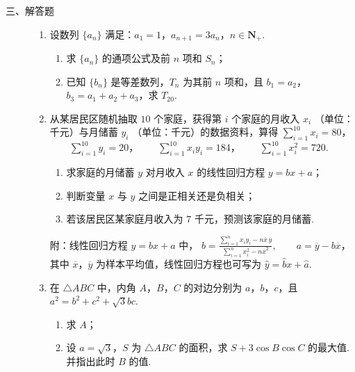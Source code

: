 \begin{description}

    \item[三、解答题]

    \begin{enumerate}[leftmargin=5pt]

      \addtocounter{enumi}{+15}

        \item 设数列 \(\{a_{n}\}\) 满足：\(a_{1} = 1\)，\(a_{n+1} = 3a_{n}\)，\(n \in \mathbf{N}_{+}\).
\begin{enumerate}
\item 求 \( \{a_{n}\} \) 的通项公式及前 \(n\) 项和 \( S_{n} \)；
\item 已知 \( \{b_{n}\} \) 是等差数列，\( T_{n} \) 为其前 \(n\) 项和，且 \(b_{1}=a_{2}\)，\(b_{3}=a_{1}+a_{2}+a_{3}\)，求 \(T_{20}\).
\end{enumerate}

        \item 从某居民区随机抽取 \(10\text{ 个}\)家庭，获得第 \(i\) 个家庭的月收入 \(x_{i}\) （单位：\(\text{千元}\)）与月储蓄 \(y_{i}\) （单位：\(\text{千元}\)）的数据资料，算得 \(\sum_{i=1}^{10} x_{i} = 80\)，\(\qquad \sum_{i=1}^{10} y_{i} = 20\)，\(\qquad \sum_{i=1}^{10} x_{i}y_{i} = 184\)，\(\qquad \sum_{i=1}^{10} x_{i}^{2} = 720.\)
\begin{enumerate}
\item 求家庭的月储蓄 \(y\) 对月收入 \(x\) 的线性回归方程 \(y = bx + a\)；
\item 判断变量 \(x\) 与 \(y\) 之间是正相关还是负相关；
\item 若该居民区某家庭月收入为 \(7\text{ 千元}\)，预测该家庭的月储蓄.
\end{enumerate}
附：线性回归方程 \(y = bx + a\) 中， \(b = \frac{\sum_{i=1}^{n} x_{i}y_{i} - n\overline{x}\,\overline{y}}{\sum_{i=1}^{n} x_{i}^{2} - n\overline{x}^{2}},\qquad a = \overline{y} - b\overline{x}\)，
其中 \(\overline{x}\)，\(\overline{y}\) 为样本平均值，线性回归方程也可写为 \(\hat{y} = \hat{b}x + \hat{a}\).

        \item 在 \(\triangle ABC\) 中，内角 \(A\)，\(B\)，\(C\) 的对边分别为 \(a\)，\(b\)，\(c\)，且 \(a^2 = b^2 + c^2 + \sqrt{3}bc\).
\begin{enumerate}
\item 求 \(A\)；
\item 设 \(a = \sqrt{3}\)，\(S\) 为 \(\triangle ABC\) 的面积，求 \(S + 3\cos B\cos C\) 的最大值. 并指出此时 \(B\) 的值.
\end{enumerate}


\end{enumerate}
\end{description}
